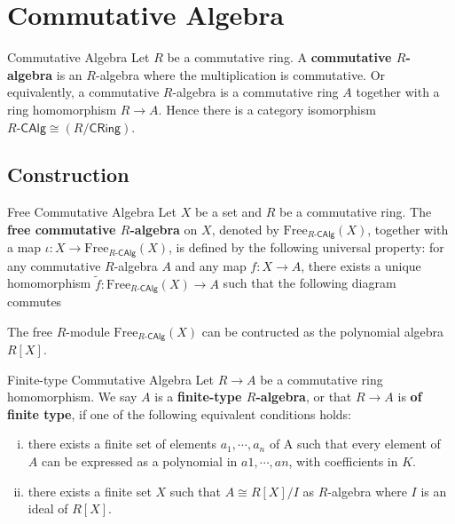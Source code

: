 \section{Commutative Algebra}
\begin{definition}{Commutative Algebra}{}
    Let $R$ be a commutative ring. A \textbf{commutative $R$-algebra} is an $R$-algebra where the multiplication is commutative. Or equivalently, a commutative $R$-algebra is a commutative ring $A$ together with a ring homomorphism $R\to A$. Hence there is a category isomorphism $R\text{-}\mathsf{CAlg}\cong \left(R/\mathsf{CRing}\right)$.
\end{definition}

\subsection{Construction}

\begin{definition}{Free Commutative Algebra}{}
    Let $X$ be a set and $R$ be a commutative ring. The \textbf{free commutative $R$-algebra} on $X$, denoted by $\mathrm{Free}_{R\text{-}\mathsf{CAlg}}(X)$, together with a map $\iota:X\to \mathrm{Free}_{R\text{-}\mathsf{CAlg}}(X)$, is defined by the following universal property: for any commutative $R$-algebra $A$ and any map $f:X\to A$, there exists a unique homomorphism $\widetilde{f}:\mathrm{Free}_{R\text{-}\mathsf{CAlg}}(X)\to A$ such that the following diagram commutes
    \begin{center}
    \end{center}
    The free $R$-module $\mathrm{Free}_{R\text{-}\mathsf{CAlg}}(X)$ can be contructed as the polynomial algebra $R[X]$.
\end{definition}

\begin{definition}{Finite-type Commutative Algebra}{}
    Let $R\to A$ be a commutative ring homomorphism. We say $A$ is a \textbf{finite-type $R$-algebra}, or that $R\to A$ is \textbf{of finite type}, if one of the following equivalent conditions holds:
    \begin{enumerate}[(i)]
        \item there exists a finite set of elements $a_1,\cdots,a_n$ of A such that every element of $A$ can be expressed as a polynomial in $a1,\cdots,an$, with coefficients in $K$.
        \item there exists a finite set $X$ such that $A\cong R[X]/I$ as $R$-algebra where $I$ is an ideal of $R[X]$.
    \end{enumerate}
    
\end{definition}


